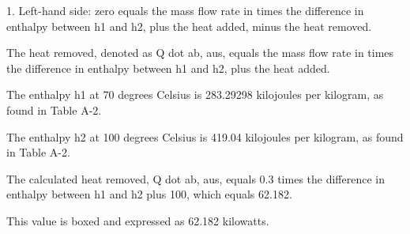 1. Left-hand side: zero equals the mass flow rate in times the difference in enthalpy between h1 and h2, plus the heat added, minus the heat removed.

The heat removed, denoted as Q dot ab, aus, equals the mass flow rate in times the difference in enthalpy between h1 and h2, plus the heat added.

The enthalpy h1 at 70 degrees Celsius is 283.29298 kilojoules per kilogram, as found in Table A-2.

The enthalpy h2 at 100 degrees Celsius is 419.04 kilojoules per kilogram, as found in Table A-2.

The calculated heat removed, Q dot ab, aus, equals 0.3 times the difference in enthalpy between h1 and h2 plus 100, which equals 62.182.

This value is boxed and expressed as 62.182 kilowatts.